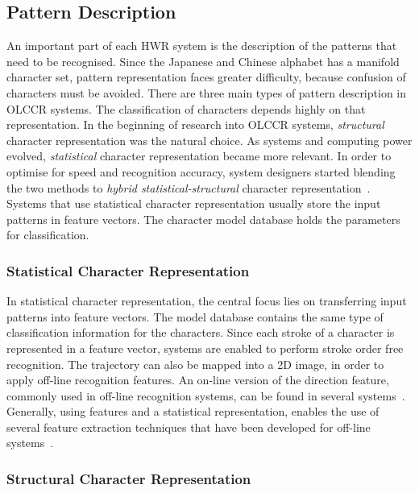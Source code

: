 \subsection{Pattern Description}
\label{sec:olccr:patterndescription}

An important part of each HWR system is the description of the patterns that
need to be recognised. Since the Japanese and Chinese alphabet has a manifold 
character set, pattern representation faces greater difficulty, because confusion
of characters must be avoided.
There are three main types of pattern description in OLCCR systems. The 
classification of characters depends highly on that representation.
In the beginning of research into OLCCR systems, \emph{structural} character 
representation was the natural choice. As systems and computing power evolved, 
\emph{statistical} character representation became more relevant. In order to 
optimise for speed and recognition accuracy, system designers started blending
the two methods to \emph{hybrid statistical-structural} character 
representation~. Systems that use statistical character
representation usually store the input patterns in feature vectors. The character
model database holds the parameters for classification.

\subsubsection{Statistical Character Representation} 
\label{sec:olccr:statisticalrepresentation}

In statistical character representation, the central focus lies on transferring
input patterns into feature vectors. The model database contains the same type
of classification information for the characters.
Since each stroke of a character is represented in a feature vector, 
systems are enabled to perform stroke order free recognition. The trajectory
can also be mapped into a 2D image, in order to apply off-line recognition 
features. An on-line version of the direction feature, commonly used in 
off-line recognition systems, can be found in several 
systems~. 
Generally, using features and a statistical representation, 
enables the use of several feature extraction techniques that have been 
developed for off-line systems~.

\subsubsection{Structural Character Representation}
\label{sec:olccr:structuralcharacterrepresentation}

